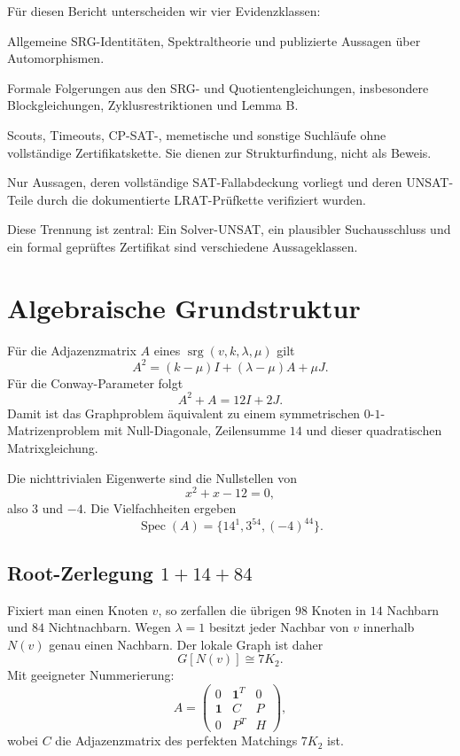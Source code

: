 \documentclass[11pt,a4paper]{article}
\newcommand{\srg}{\operatorname{srg}}
\begin{document}
Für diesen Bericht unterscheiden wir vier Evidenzklassen:
\begin{description}[style=nextline,leftmargin=0mm]
\item[Publizierte bzw.\ Standardtheorie.]
Allgemeine SRG-Identitäten, Spektraltheorie und publizierte Aussagen über Automorphismen.
\item[Eigene mathematische Ableitung.]
Formale Folgerungen aus den SRG- und Quotientengleichungen, insbesondere Blockgleichungen, Zyklusrestriktionen und Lemma B.
\item[Explorative Rechnung.]
Scouts, Timeouts, CP-SAT-, memetische und sonstige Suchläufe ohne vollständige Zertifikatskette. Sie dienen zur Strukturfindung, nicht als Beweis.
\item[Zertifizierte Rechnung.]
Nur Aussagen, deren vollständige SAT-Fallabdeckung vorliegt und deren UNSAT-Teile durch die dokumentierte LRAT-Prüfkette verifiziert wurden.
\end{description}

Diese Trennung ist zentral: Ein Solver-UNSAT, ein plausibler Suchausschluss und ein formal geprüftes Zertifikat sind verschiedene Aussageklassen.

\section{Algebraische Grundstruktur}

Für die Adjazenzmatrix $A$ eines $\srg(v,k,\lambda,\mu)$ gilt
\[
A^2=(k-\mu)I+(\lambda-\mu)A+\mu J.
\]
Für die Conway-Parameter folgt
\[
\boxed{A^2+A=12I+2J.}
\]
Damit ist das Graphproblem äquivalent zu einem symmetrischen $0$-$1$-Matrizenproblem mit Null-Diagonale, Zeilensumme $14$ und dieser quadratischen Matrixgleichung.

Die nichttrivialen Eigenwerte sind die Nullstellen von
\[
x^2+x-12=0,
\]
also $3$ und $-4$. Die Vielfachheiten ergeben
\[
\operatorname{Spec}(A)=\{14^1,3^{54},(-4)^{44}\}.
\]

\subsection{Root-Zerlegung $1+14+84$}

Fixiert man einen Knoten $v$, so zerfallen die übrigen $98$ Knoten in $14$ Nachbarn und $84$ Nichtnachbarn. Wegen $\lambda=1$ besitzt jeder Nachbar von $v$ innerhalb $N(v)$ genau einen Nachbarn. Der lokale Graph ist daher
\[
G[N(v)]\cong 7K_2.
\]
Mit geeigneter Nummerierung:
\[
A=
\begin{pmatrix}
0 & \mathbf 1^T & 0\\
\mathbf 1 & C & P\\
0 & P^T & H
\end{pmatrix},
\]
wobei $C$ die Adjazenzmatrix des perfekten Matchings $7K_2$ ist.
\end{document}
